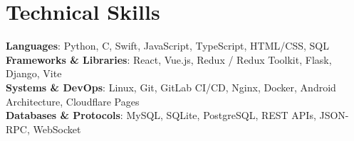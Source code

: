 \documentclass[letterpaper,10pt]{article}
\begin{document}
\section{Technical Skills}
\begin{itemize}[leftmargin=0.15in, label={}]
    \small{\item{
     \textbf{Languages}{: Python, C, Swift, JavaScript, TypeScript, HTML/CSS, SQL} \\
     \textbf{Frameworks \& Libraries}{: React, Vue.js, Redux / Redux Toolkit, Flask, Django, Vite} \\
     \textbf{Systems \& DevOps}{: Linux, Git, GitLab CI/CD, Nginx, Docker, Android Architecture, Cloudflare Pages} \\
     \textbf{Databases \& Protocols}{: MySQL, SQLite, PostgreSQL, REST APIs, JSON-RPC, WebSocket} \\
    }}
\end{itemize}
\end{document}
